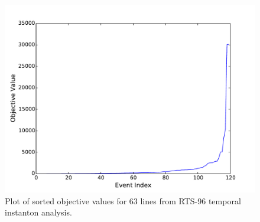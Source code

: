 \documentclass[conference]{IEEEtran}
\begin{document}
\begin{figure}
\centering
\includegraphics[width=1\linewidth]{../images/scores}
\caption{Plot of sorted objective values for 63 lines from RTS-96 temporal instanton analysis.}
\label{fig:scores}
\end{figure}





%

\end{document}
